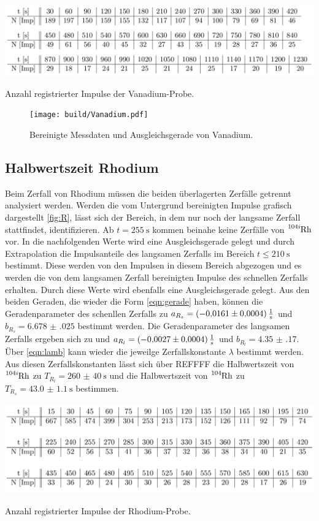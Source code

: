 \begin{table}
\centering
\includegraphics[width=\textwidth]{data/Vanadium.png}
\caption{Anzahl registrierter Impulse der Vanadium-Probe.}
\label{tab:V}
\end{table}

\begin{figure}
\centering
\texttt{[image: build/Vanadium.pdf]}
\caption{Bereinigte Messdaten und Ausgleichsgerade von Vanadium.}
\label{fig:V}
\end{figure}

\subsection{Halbwertszeit Rhodium}
Beim Zerfall von Rhodium müssen die beiden überlagerten Zerfälle getrennt analysiert werden. Werden die vom Untergrund bereinigten Impulse grafisch dargestellt \ref{fig:R}, lässt sich der Bereich, in dem nur noch der langsame Zerfall stattfindet, identifizieren. Ab $t=\SI{255}{\s}$ kommen beinahe keine Zerfälle von $\ce{^{104i}Rh}$ vor. In die nachfolgenden Werte wird eine Ausgleichsgerade gelegt und durch Extrapolation die Impulsanteile des langsamen Zerfalls im Bereich $t\leq\SI{210}{\s}$ bestimmt. Diese werden von den Impulsen in diesem Bereich abgezogen und es werden die von dem langsamen Zerfall bereinigten Impulse des schnellen Zerfalls erhalten. Durch diese Werte wird ebenfalls eine Ausgleichsgerade gelegt. Aus den beiden Geraden, die wieder die Form \eqref{eqn:gerade} haben, können die Geradenparameter des schenllen Zerfalls zu $a_{R_s}=\SI{-0.0161(0004)}{\frac{1}{\s}}$ und $b_{R_s}=\num{6.678(025)}$ bestimmt werden. Die Geradenparameter des langsamen Zerfalls ergeben sich zu und $a_{R_l}=\SI{-0.0027(0004)}{\frac{1}{\s}}$ und $b_{R_l}=\num{4.35(17)}$. Über \eqref{eqn:lamb} kann wieder die jeweilge Zerfallskonstante $\lambda$ bestimmt werden. Aus diesen Zerfallskonstanten lässt sich über REFFFF die Halbwertszeit von $\ce{^{104i}Rh}$ zu $T_{R_l}=\SI{260(40)}{\s}$ und die Halbwertszeit von $\ce{^{104}Rh}$ zu $T_{R_s}=\SI{43.0(11)}{\s}$ bestimmen.



\begin{table}
\centering
\includegraphics[width=\textwidth]{data/Rhodium.png}
\caption{Anzahl registrierter Impulse der Rhodium-Probe.}
\label{tab:R}
\end{table}

